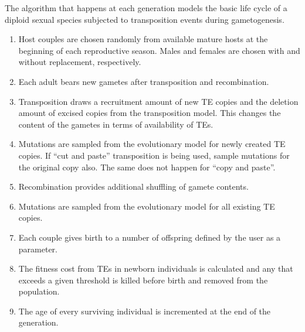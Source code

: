 \documentclass{bioinfo}
\begin{document}
\begin{methods}
The algorithm that happens at each generation models the basic
life cycle of a diploid sexual species subjected to transposition
events during gametogenesis.

\begin{enumerate}
\item Host couples are chosen randomly from available mature hosts at
  the beginning of each reproductive season. Males and females are
  chosen with and without replacement, respectively. 

\item Each adult bears new gametes after transposition and
  recombination.

\item Transposition draws a recruitment amount of new TE copies and
  the deletion amount of excised copies from the transposition
  model. This changes the content of the gametes in terms of
  availability of TEs.

\item Mutations are sampled from the evolutionary model for newly
  created TE copies. If ``cut and paste'' transposition is being used,
  sample mutations for the original copy also. The same does not
  happen for ``copy and paste''.

\item Recombination provides additional shuffling of gamete contents.

\item Mutations are sampled from the evolutionary model for all
  existing TE copies.

\item Each couple gives birth to a number of offspring defined by the
  user as a parameter.


\item The fitness cost from TEs in newborn individuals is calculated
  and any that exceeds a given threshold is killed before birth and
  removed from the population. 

\item The age of every surviving individual is incremented at the end
  of the generation.



\end{enumerate}
\end{methods}
\end{document}
